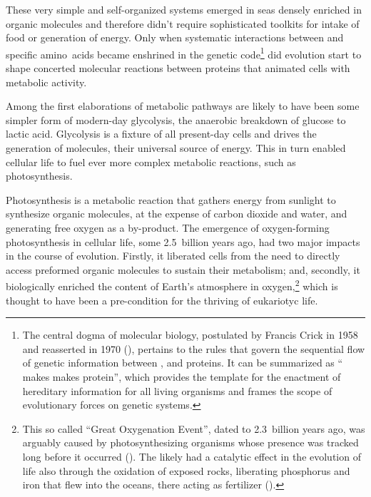 \documentclass{tufte-book}
\begin{document}
These very simple and \mbox{self-organized} systems emerged in seas densely
enriched in organic molecules and therefore didn't require sophisticated
toolkits for intake of food or generation of energy.  Only when systematic
interactions between  and specific amino~acids became enshrined
in the genetic code\footnote{The central dogma of molecular biology, postulated
  by Francis Crick in 1958 and reasserted in 1970
  (\citealp{crick_protein_1958,crick_central_1970}), pertains to the rules that
  govern the sequential flow of genetic information between ,
   and proteins. It can be summarized as `` makes
   makes protein'', which provides the template for the enactment
  of hereditary information for all living organisms and frames the scope of
  evolutionary forces on genetic systems.} did evolution start to shape
concerted molecular reactions between proteins that animated cells with
metabolic activity.

Among the first elaborations of metabolic pathways are likely to have been some
simpler form of \mbox{modern-day} glycolysis, the anaerobic breakdown of glucose
to lactic acid.  Glycolysis is a fixture of all \mbox{present-day} cells and
drives the generation of  molecules, their universal source of
energy.  This in turn enabled cellular life to fuel ever more complex metabolic
reactions, such as photosynthesis.

Photosynthesis is a metabolic reaction that gathers energy from sunlight to
synthesize organic molecules, at the expense of carbon dioxide and water, and
generating free oxygen as a \mbox{by-product}.  The emergence of
\mbox{oxygen-forming} photosynthesis in cellular life, some 2.5~billion years
ago, had two major impacts in the course of evolution.  Firstly, it liberated
cells from the need to directly access preformed organic molecules to sustain
their metabolism; and, secondly, it biologically enriched the content of Earth's
atmosphere in oxygen,\footnote{This so called ``Great Oxygenation Event'', dated
  to 2.3~billion years ago, was arguably caused by photosynthesizing organisms
  whose presence was tracked long before it occurred
  (\citealp{flannery_archean_2012}). The  likely had a catalytic
  effect in the evolution of life also through the oxidation of exposed rocks,
  liberating phosphorus and iron that flew into the oceans, there acting as
  fertilizer (\citealp{zimmer_mystery_2013}).} which is thought to have been a
\mbox{pre-condition} for the thriving of eukariotyc life.
\end{document}
